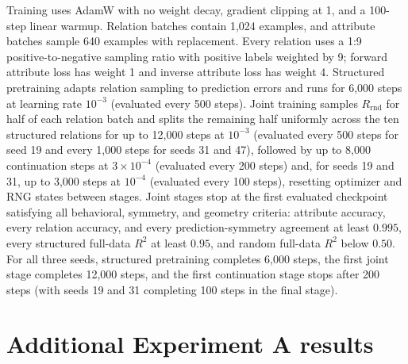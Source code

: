 \documentclass[11pt]{article}
\newcommand{\Rrnd}{R_{\mathrm{rnd}}}
\begin{document}
Training uses AdamW with no weight decay, gradient clipping at 1, and a 100-step
linear warmup. Relation batches contain 1,024 examples, and attribute batches
sample 640 examples with replacement. Every relation uses a 1:9
positive-to-negative sampling ratio with positive labels weighted by 9; forward
attribute loss has weight 1 and inverse attribute loss has weight 4. Structured
pretraining adapts relation sampling to prediction errors and runs for 6,000
steps at learning rate $10^{-3}$ (evaluated every 500 steps). Joint training
samples $\Rrnd$ for half of each relation batch and splits the remaining half
uniformly across the ten structured relations for up to 12,000 steps at
$10^{-3}$ (evaluated every 500 steps for seed 19 and every 1,000 steps for seeds
31 and 47), followed by up to 8,000 continuation steps at $3\times10^{-4}$
(evaluated every 200 steps) and, for seeds 19 and 31, up to 3,000 steps at
$10^{-4}$ (evaluated every 100 steps), resetting optimizer and RNG states between
stages. Joint stages stop at the first evaluated checkpoint satisfying all
behavioral, symmetry, and geometry criteria: attribute accuracy, every relation
accuracy, and every prediction-symmetry agreement at least $0.995$, every
structured full-data $R^2$ at least $0.95$, and random full-data $R^2$ below
$0.50$. For all three seeds, structured pretraining completes 6,000 steps, the
first joint stage completes 12,000 steps, and the first continuation stage stops
after 200 steps (with seeds 19 and 31 completing 100 steps in the final stage).

\section{Additional Experiment A results}
\label{app:goal1-extra}
\end{document}
